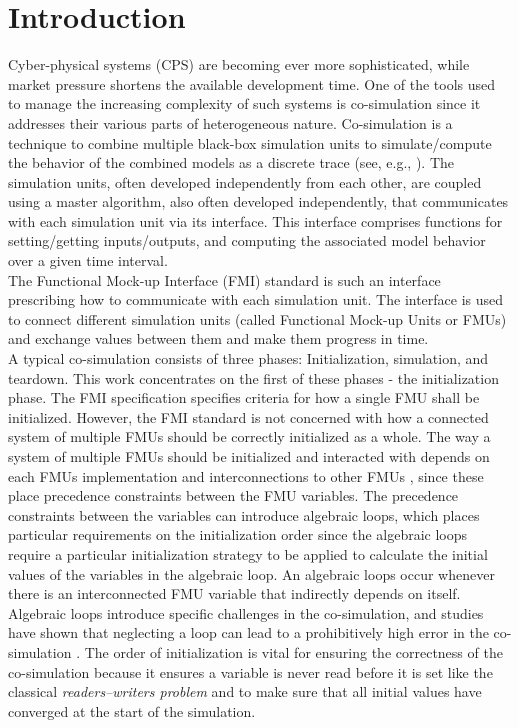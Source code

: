 \section{Introduction}\label{sc:introduction}
Cyber-physical systems (CPS) are becoming ever more sophisticated, while market pressure shortens the available development time. One of the tools used to manage the increasing complexity of such systems is co-simulation since it addresses their various parts of heterogeneous nature. Co-simulation is a technique to combine multiple black-box simulation units to simulate/compute the behavior of the combined models as a discrete trace (see, e.g., \cite{Kubler2000,Gomes2018}). The simulation units, often developed independently from each other, are coupled using a master algorithm, also often developed independently, that communicates with each simulation unit via its interface. This interface comprises functions for setting/getting inputs/outputs, and computing the associated model behavior over a given time interval. \\
The Functional Mock-up Interface (FMI) standard \cite{Blochwitz2012, fmi_2019} is such an interface prescribing how to communicate with each simulation unit. The interface is used to connect different simulation units (called Functional Mock-up Units or FMUs) and exchange values between them and make them progress in time. \\

A typical co-simulation consists of three phases: Initialization, simulation, and teardown. This work concentrates on the first of these phases - the initialization phase. The FMI specification specifies criteria for how a single FMU shall be initialized. However, the FMI standard is not concerned with how a connected system of multiple FMUs should be correctly initialized as a whole. 
The way a system of multiple FMUs should be initialized and interacted with depends on each FMUs implementation and interconnections to other FMUs \cite{gomes_lucio_vangheluwe_2019}, since these place precedence constraints between the FMU variables. The precedence constraints between the variables can introduce algebraic loops, which places particular requirements on the initialization order since the algebraic loops require a particular initialization strategy to be applied to calculate the initial values of the variables in the algebraic loop\cite{Bastian2011a}. An algebraic loops occur whenever there is an interconnected FMU variable that indirectly depends on itself. Algebraic loops introduce specific challenges in the co-simulation, and studies have shown that neglecting a loop can lead to a prohibitively high error in the co-simulation \cite{Arnold2014}. The order of initialization is vital for ensuring the correctness of the co-simulation \cite{Thule2018} because it ensures a variable is never read before it is set like the classical \textit{readers–writers problem} and to make sure that all initial values have converged at the start of the simulation. 


